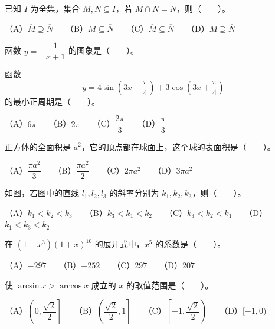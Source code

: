 \begin{question}
已知 $I$ 为全集，集合 $M,N\subseteq I$，若 $M\cap N=N$，则\mbox{（　　）}。

（A）$\overline{M}\supseteq\overline{N}$　　（B）$M\subseteq\overline{N}$　　（C）$\overline{M}\subseteq\overline{N}$　　（D）$M\supseteq\overline{N}$

\Needspace{0.4\textheight}
\end{question}
\begin{question}
函数 $y=-\dfrac{1}{x+1}$ 的图象是\mbox{（　　）}。
\nopagebreak[4]
\begin{center}\end{center}
\nopagebreak[4]
\end{question}
\begin{question}
函数
\nopagebreak[4]
\[
y=4\sin\left(3x+\frac\pi4\right)+3\cos\left(3x+\frac\pi4\right)
\]
的最小正周期是\mbox{（　　）}。

（A）$6\pi$　　（B）$2\pi$　　（C）$\dfrac{2\pi}{3}$　　（D）$\dfrac\pi3$

\end{question}
\begin{question}
正方体的全面积是 $a^2$，它的顶点都在球面上，这个球的表面积是\mbox{（　　）}。

（A）$\dfrac{\pi a^2}{3}$　　（B）$\dfrac{\pi a^2}{2}$　　（C）$2\pi a^2$　　（D）$3\pi a^2$

\Needspace{0.4\textheight}
\end{question}
\begin{question}
如图，若图中的直线 $l_1,l_2,l_3$ 的斜率分别为 $k_1,k_2,k_3$，则\mbox{（　　）}。
\nopagebreak[4]
\begin{center}\end{center}
\nopagebreak[4]
（A）$k_1<k_2<k_3$　　（B）$k_3<k_1<k_2$　　（C）$k_3<k_2<k_1$　　（D）$k_1<k_3<k_2$

\end{question}
\begin{question}
在 $(1-x^3)(1+x)^{10}$ 的展开式中，$x^5$ 的系数是\mbox{（　　）}。

（A）$-297$　　（B）$-252$　　（C）$297$　　（D）$207$

\end{question}
\begin{question}
使 $\arcsin x>\arccos x$ 成立的 $x$ 的取值范围是\mbox{（　　）}。

（A）$\left(0,\dfrac{\sqrt2}{2}\right]$　　（B）$\left(\dfrac{\sqrt2}{2},1\right]$　　（C）$\left[-1,\dfrac{\sqrt2}{2}\right)$　　（D）$[-1,0)$

\end{question}
